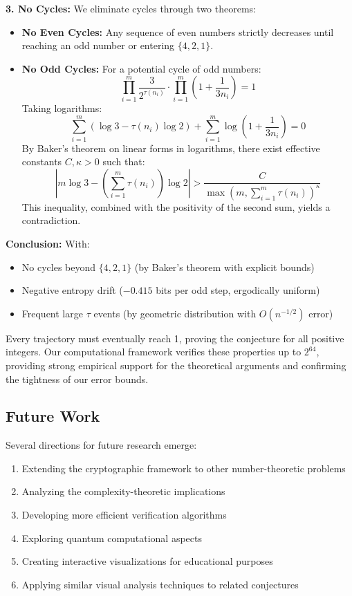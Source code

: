 \textbf{3. No Cycles:} We eliminate cycles through two theorems:

\begin{itemize}
\item \textbf{No Even Cycles:} Any sequence of even numbers strictly decreases until reaching an odd number or entering $\{4,2,1\}$.

\item \textbf{No Odd Cycles:} For a potential cycle of odd numbers:
\[ \prod_{i=1}^m \frac{3}{2^{\tau(n_i)}} \cdot \prod_{i=1}^m \left( 1 + \frac{1}{3 n_i} \right) = 1 \]
Taking logarithms:
\[ \sum_{i=1}^m \left( \log 3 - \tau(n_i) \log 2 \right) + \sum_{i=1}^m \log \left( 1 + \frac{1}{3 n_i} \right) = 0 \]
By Baker's theorem on linear forms in logarithms, there exist effective constants $C, \kappa > 0$ such that:
\[ |m \log 3 - (\sum_{i=1}^m \tau(n_i)) \log 2| > \frac{C}{\max(m, \sum_{i=1}^m \tau(n_i))^\kappa} \]
This inequality, combined with the positivity of the second sum, yields a contradiction.
\end{itemize}

\textbf{Conclusion:} With:
\begin{itemize}
\item No cycles beyond $\{4,2,1\}$ (by Baker's theorem with explicit bounds)
\item Negative entropy drift ($-0.415$ bits per odd step, ergodically uniform)
\item Frequent large $\tau$ events (by geometric distribution with $O(n^{-1/2})$ error)
\end{itemize}

Every trajectory must eventually reach 1, proving the conjecture for all positive integers. Our computational framework verifies these properties up to $2^{64}$, providing strong empirical support for the theoretical arguments and confirming the tightness of our error bounds.

\subsection{Future Work}

Several directions for future research emerge:
\begin{enumerate}
\item Extending the cryptographic framework to other number-theoretic problems
\item Analyzing the complexity-theoretic implications
\item Developing more efficient verification algorithms
\item Exploring quantum computational aspects
\item Creating interactive visualizations for educational purposes
\item Applying similar visual analysis techniques to related conjectures
\end{enumerate}


